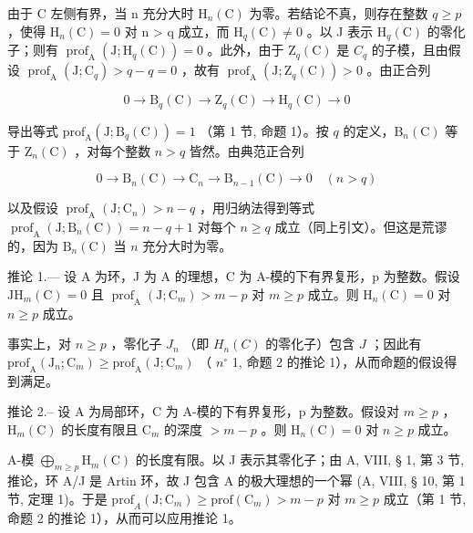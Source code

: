 由于 C 左侧有界，当 n 充分大时 \(\mathrm{H}_{n}(\mathrm{C})\) 为零。若结论不真，则存在整数 \(q \geqslant p\) ，使得 \(\mathrm{H}_{n}(\mathrm{C}) = 0\) 对 n \textgreater{} q 成立，而 \(\mathrm{H}_{q}(\mathrm{C}) \neq 0\) 。以 J 表示 \(\mathrm{H}_{q}(\mathrm{C})\) 的零化子；则有 \(\operatorname{prof}_{\mathrm{A}}(\mathrm{J}; \mathrm{H}_{q}(\mathrm{C})) = 0\) 。此外，由于 \(\mathrm{Z}_{q}(\mathrm{C})\) 是 \(C_{q}\) 的子模，且由假设 \(\operatorname{prof}_{\mathrm{A}}(\mathrm{J}; \mathrm{C}_{q}) > q - q = 0\) ，故有 \(\operatorname{prof}_{\mathrm{A}}(\mathrm{J}; \mathrm{Z}_{q}(\mathrm{C})) > 0\) 。由正合列

\[
0 \to \mathrm{B} _ {q} (\mathrm{C}) \to \mathrm{Z} _ {q} (\mathrm{C}) \to \mathrm{H} _ {q} (\mathrm{C}) \to 0
\]

导出等式 \(\mathrm{prof}_{\mathrm{A}}(\mathrm{J};\mathrm{B}_q(\mathrm{C})) = 1\) （第 1 节, 命题 1）。按 \(q\) 的定义，\(\mathrm{B}_n(\mathrm{C})\) 等于 \(\mathrm{Z}_n(\mathrm{C})\) ，对每个整数 \(n > q\) 皆然。由典范正合列

\[
0 \to \mathrm{B} _ {n} (\mathrm{C}) \to \mathrm{C} _ {n} \to \mathrm{B} _ {n - 1} (\mathrm{C}) \to 0 \quad (n > q)
\]

以及假设 \(\operatorname{prof}_{\mathrm{A}}(\mathrm{J};\mathrm{C}_{n}) > n - q\) ，用归纳法得到等式 \(\operatorname{prof}_{\mathrm{A}}(\mathrm{J};\mathrm{B}_{n}(\mathrm{C})) = n - q + 1\) 对每个 \(n \geqslant q\) 成立（同上引文）。但这是荒谬的，因为 \(\mathrm{B}_{n}(\mathrm{C})\) 当 \(n\) 充分大时为零。

推论 1.--- 设 A 为环，J 为 A 的理想，C 为 A-模的下有界复形，p 为整数。假设 \(\mathrm{JH}_{m}(\mathrm{C}) = 0\) 且 \(\operatorname{prof}_{\mathrm{A}}(\mathrm{J}; \mathrm{C}_{m}) > m - p\) 对 \(m \geqslant p\) 成立。则 \(\mathrm{H}_{n}(\mathrm{C}) = 0\) 对 \(n \geqslant p\) 成立。

事实上，对 \(n \geqslant p\) ，零化子 \(J_n\) （即 \(H_n(C)\) 的零化子）包含 \(J\) ；因此有 \(\mathrm{prof}_{\mathrm{A}}(\mathrm{J}_{n};\mathrm{C}_{m}) \geqslant \mathrm{prof}_{\mathrm{A}}(\mathrm{J};\mathrm{C}_{m})\) （ \(n^{\circ}\) 1, 命题 2 的推论 1），从而命题的假设得到满足。

推论 2.-- 设 A 为局部环，C 为 A-模的下有界复形，p 为整数。假设对 \(m \geqslant p\) ，\(\mathrm{H}_{m}(\mathrm{C})\) 的长度有限且 \(\mathrm{C}_{m}\) 的深度 \(>m-p\) 。则 \(\mathrm{H}_{n}(\mathrm{C}) = 0\) 对 \(n \geqslant p\) 成立。

A-模 \(\bigoplus_{m\geqslant p}\mathrm{H}_{m}(\mathrm{C})\) 的长度有限。以 J 表示其零化子；由 A, VIII, § 1, 第 3 节, 推论，环 A/J 是 Artin 环，故 J 包含 A 的极大理想的一个幂 (A, VIII, § 10, 第 1 节, 定理 1)。于是 \(\mathrm{prof}_A(\mathrm{J};\mathrm{C}_m)\geqslant \mathrm{prof}(\mathrm{C}_m) > m - p\) 对 \(m\geqslant p\) 成立（第 1 节, 命题 2 的推论 1），从而可以应用推论 1。

